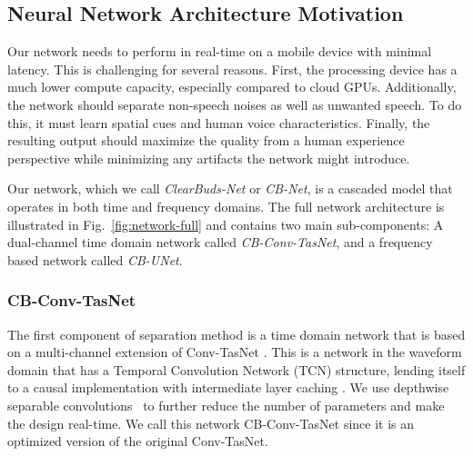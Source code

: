 \documentclass [11pt, proquest] {uwthesis}[2020/02/24]
\begin{document}
\subsection{Neural Network Architecture Motivation}\label{sec:nn}




  {Our network needs to perform in real-time on a mobile device with minimal latency.}
 This is challenging for several reasons. First, the processing device has a much lower compute capacity, especially compared to cloud GPUs. Additionally, the network should separate non-speech noises as well as unwanted speech. To do this, it must learn spatial cues and human voice characteristics. Finally, the resulting output should maximize the quality from a human experience perspective while minimizing any artifacts the network might introduce. 

Our network, which we call \textit{ClearBuds-Net} or \textit{CB-Net}, is a cascaded model that operates in both  time  and frequency domains. The full network architecture is illustrated in Fig.~\ref{fig:network-full} and contains two main sub-components: A dual-channel time domain network called \textit{CB-Conv-TasNet}, and a frequency based network called \textit{CB-UNet}. %






\subsubsection{CB-Conv-TasNet}
The first component of separation method is a time domain network that is based on a multi-channel extension of Conv-TasNet \cite{luo2019conv}. This is a network in the waveform domain that  has a  Temporal Convolution Network (TCN) structure, lending itself to a causal implementation with intermediate layer caching \cite{paine2016fast}. We  use depthwise separable convolutions~\cite{howard2017mobilenets} to  further reduce the number of parameters and make the design real-time. We call this network CB-Conv-TasNet since it is an optimized version of the original Conv-TasNet.
\end{document}
